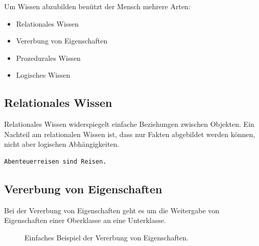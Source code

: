 Um Wissen abzubilden benützt der Mensch mehrere Arten:
\begin{itemize}
    \item Relationales Wissen
    \item Vererbung von Eigenschaften
    \item Prozedurales Wissen
    \item Logisches Wissen
\end{itemize}
\label{itm:wissensarten}

\subsection{Relationales Wissen}
\label{subsec:relationales_wissen}
Relationales Wissen widerspiegelt einfache Beziehungen zwischen Objekten. Ein Nachteil am relationalen Wissen ist, dass nur Fakten abgebildet werden können, nicht aber logischen Abhängigkeiten.

\begin{lstlisting}[caption={Einfaches Beispiel von relationalem Wissen.}]
     Abenteuerreisen sind Reisen.
\end{lstlisting}

\newpage

\subsection{Vererbung von Eigenschaften}
\label{subsec:vererbung_eigenschaft}
Bei der Vererbung von Eigenschaften geht es um die Weitergabe von Eigenschaften einer Oberklasse an eine Unterklasse.

\begin{figure}[htbp]
\centering {}
\caption{Einfaches Beispiel der Vererbung von Eigenschaften.\label{fig:experten_systeme_vererbung}\protect\footnotemark}
\end{figure}


